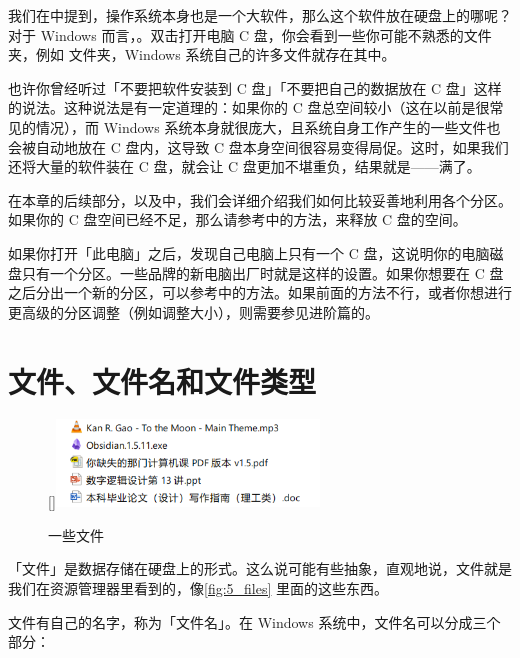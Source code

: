 我们在中提到，操作系统本身也是一个大软件，那么这个软件放在硬盘上的哪呢？对于 Windows 而言，。双击打开电脑 C 盘，你会看到一些你可能不熟悉的文件夹，例如  文件夹，Windows 系统自己的许多文件就存在其中。

也许你曾经听过「不要把软件安装到 C 盘」「不要把自己的数据放在 C 盘」这样的说法。这种说法是有一定道理的：如果你的 C 盘总空间较小（这在以前是很常见的情况），而 Windows 系统本身就很庞大，且系统自身工作产生的一些文件也会被自动地放在 C 盘内，这导致 C 盘本身空间很容易变得局促。这时，如果我们还将大量的软件装在 C 盘，就会让 C 盘更加不堪重负，结果就是——满了。

在本章的后续部分，以及中，我们会详细介绍我们如何比较妥善地利用各个分区。如果你的 C 盘空间已经不足，那么请参考中的方法，来释放 C 盘的空间。

\begin{note}
  如果你打开「此电脑」之后，发现自己电脑上只有一个 C 盘，这说明你的电脑磁盘只有一个分区。一些品牌的新电脑出厂时就是这样的设置。如果你想要在 C 盘之后分出一个新的分区，可以参考中的方法。如果前面的方法不行，或者你想进行更高级的分区调整（例如调整大小），则需要参见进阶篇的。
\end{note}

\section{文件、文件名和文件类型}

\begin{figure}
  \centering
  \raisebox{0pt}[\dimexpr{}\baselineskip\relax]{\includegraphics[width=7cm]{assets/basic/5_files.png}}
  \caption{一些文件}
  \label{fig:5_files}
\end{figure}

「文件」是数据存储在硬盘上的形式。这么说可能有些抽象，直观地说，文件就是我们在资源管理器里看到的，像\autoref{fig:5_files} 里面的这些东西。

文件有自己的名字，称为「文件名」。在 Windows 系统中，文件名可以分成三个部分：

